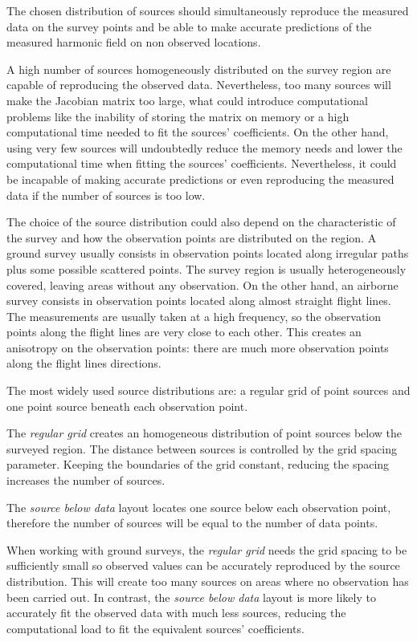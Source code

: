 \documentclass[twocolumn]{article}
\begin{document}
The chosen distribution of sources should simultaneously reproduce the measured
data on the survey points and be able to make accurate predictions of the
measured harmonic field on non observed locations.

A high number of sources homogeneously distributed on the survey region are
capable of reproducing the observed data. Nevertheless, too many sources will
make the Jacobian matrix too large, what could introduce computational problems
like the inability of storing the matrix on memory or a high computational time
needed to fit the sources' coefficients.
On the other hand, using very few sources will undoubtedly reduce the memory
needs and lower the computational time when fitting the sources' coefficients.
Nevertheless, it could be incapable of making accurate predictions or even
reproducing the measured data if the number of sources is too low.

The choice of the source distribution could also depend on the characteristic
of the survey and how the observation points are distributed on the region.
A ground survey usually consists in observation points located along irregular
paths plus some possible scattered points.
The survey region is usually heterogeneously covered, leaving areas without any
observation.
On the other hand, an airborne survey consists in observation points located
along almost straight flight lines. The measurements are usually taken at
a high frequency, so the observation points along the flight lines are very
close to each other.
This creates an anisotropy on the observation points: there are much more
observation points along the flight lines directions.

The most widely used source distributions are: a regular grid of point sources
and one point source beneath each observation point.

The \emph{regular grid} creates an homogeneous distribution of point sources
below the surveyed region.
The distance between sources is controlled by the grid spacing parameter.
Keeping the boundaries of the grid constant, reducing the spacing increases the
number of sources.

The \emph{source below data} layout locates one source below each
observation point, therefore the number of sources will be equal to the number
of data points.

When working with ground surveys, the \emph{regular grid} needs the grid
spacing to be sufficiently small so observed values can be accurately
reproduced by the source distribution.
This will create too many sources on areas where no observation has been
carried out.
In contrast, the \emph{source below data} layout is more likely to accurately
fit the observed data with much less sources, reducing the computational load
to fit the equivalent sources' coefficients.
\end{document}
